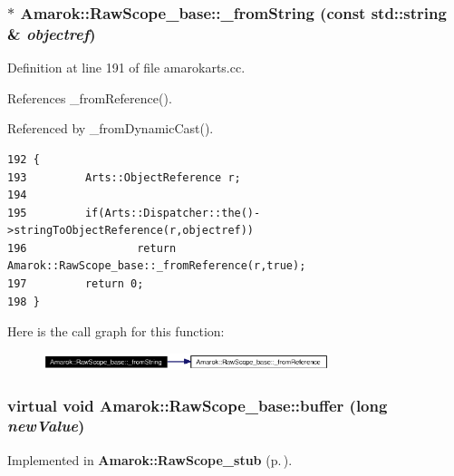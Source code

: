 \subsubsection{ $\ast$ Amarok::Raw\-Scope\_\-base::\_\-from\-String (const std::string \& {\em objectref})\hspace{0.3cm}{\tt  [static]}}\label{classAmarok_1_1RawScope__base_Amarok_1_1RawScope__stube1}




Definition at line 191 of file amarokarts.cc.

References \_\-from\-Reference().

Referenced by \_\-from\-Dynamic\-Cast().



\footnotesize\begin{verbatim}192 {
193         Arts::ObjectReference r;
194 
195         if(Arts::Dispatcher::the()->stringToObjectReference(r,objectref))
196                 return Amarok::RawScope_base::_fromReference(r,true);
197         return 0;
198 }
\end{verbatim}\normalsize 


Here is the call graph for this function:\begin{figure}[H]
\begin{center}
\leavevmode
\includegraphics[width=236pt]{classAmarok_1_1RawScope__base_Amarok_1_1RawScope__stube1_cgraph}
\end{center}
\end{figure}
\subsubsection{\setlength{\rightskip}{0pt plus 5cm}virtual void Amarok::Raw\-Scope\_\-base::buffer (long {\em new\-Value})\hspace{0.3cm}{\tt  [pure virtual]}}\label{classAmarok_1_1RawScope__base_Amarok_1_1RawScope__skela10}




Implemented in {\bf Amarok::Raw\-Scope\_\-stub} {\rm (p.\,\pageref{classAmarok_1_1RawScope__stub_Amarok_1_1RawScope__stuba2})}.
